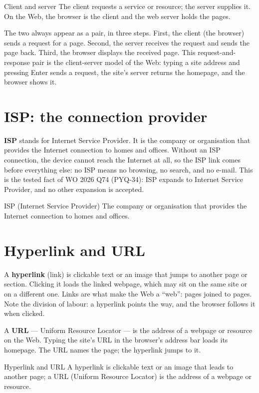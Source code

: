 \begin{definitionbox}{Client and server}
The client requests a service or resource; the server supplies it. On the
Web, the browser is the client and the web server holds the pages.
\end{definitionbox}

The two always appear as a pair, in three steps. First, the client (the
browser) sends a request for a page. Second, the server receives the request
and sends the page back. Third, the browser displays the received page. This
request-and-response pair is the client-server model of the Web: typing a
site address and pressing Enter sends a request, the site's server returns
the homepage, and the browser shows it.

\section{ISP: the connection provider}
\textbf{ISP} stands for Internet Service Provider. It is the company or
organisation that provides the Internet connection to homes and offices.
Without an ISP connection, the device cannot reach the Internet at all, so
the ISP link comes before everything else: no ISP means no browsing, no
search, and no e-mail. This is the tested fact of WO 2026 Q74 (PYQ-34): ISP
expands to Internet Service Provider, and no other expansion is accepted.

\begin{definitionbox}{ISP (Internet Service Provider)}
The company or organisation that provides the Internet connection to homes
and offices.
\end{definitionbox}

\section{Hyperlink and URL}
A \textbf{hyperlink} (link) is clickable text or an image that jumps to
another page or section. Clicking it loads the linked webpage, which may sit
on the same site or on a different one. Links are what make the Web a
``web'': pages joined to pages. Note the division of labour: a hyperlink
points the way, and the browser follows it when clicked.

A \textbf{URL} --- Uniform Resource Locator --- is the address of a webpage
or resource on the Web. Typing the site's URL in the browser's address bar
loads its homepage. The URL names the page; the hyperlink jumps to it.

\begin{definitionbox}{Hyperlink and URL}
A hyperlink is clickable text or an image that leads to another page; a URL
(Uniform Resource Locator) is the address of a webpage or resource.
\end{definitionbox}

